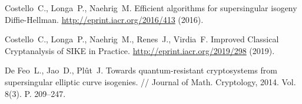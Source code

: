 \documentclass[a4paper,12pt]{article}
\theoremstyle{definition}
\begin{document}
\begin{thebibliography}{1}
 Costello~C., Longa~P., Naehrig~M. Efficient algorithms for supersingular isogeny Diffie-Hellman. \url{http://eprint.iacr.org/2016/413} (2016).


 Costello~C., Longa~P., Naehrig~M., Renes~J., Virdia~F. Improved Classical Cryptanalysis of SIKE in Practice. \url{http://eprint.iacr.org/2019/298} (2019).





 
 
   De Feo~L., Jao~D., Plût~J.   Towards quantum-resistant cryptosystems from supersingular elliptic curve isogenies.  // Journal of Math. Cryptology, 2014. Vol. 8(3). P. 209--247. 

%  




  


\end{thebibliography}
\end{document}
